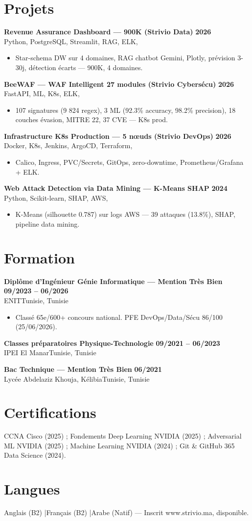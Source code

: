 \documentclass[a4paper,10pt]{article}
\newcommand{\cventry}[4]{\textbf{#1} \hfill \textbf{#4}\\[1pt]#2{\ifx\relax#3\relax\else, #3\fi}\par\vspace{2pt}}
\begin{document}
\section{Projets}
\cventry{Revenue Assurance Dashboard — 900K (Strivio Data)}{Python, PostgreSQL, Streamlit, RAG, ELK}{}{2026}
\begin{itemize}
  \item Star-schema DW sur 4 domaines, RAG chatbot Gemini, Plotly, prévision 3-30j, détection écarts — 900K, 4 domaines.
\end{itemize}
\cventry{BeeWAF — WAF Intelligent 27 modules (Strivio Cybersécu)}{FastAPI, ML, K8s, ELK}{}{2026}
\begin{itemize}
  \item 107 signatures (9 824 regex), 3 ML (92.3\% accuracy, 98.2\% precision), 18 couches évasion, MITRE 22, 37 CVE — K8s prod.
\end{itemize}
\cventry{Infrastructure K8s Production — 5 nœuds (Strivio DevOps)}{Docker, K8s, Jenkins, ArgoCD, Terraform}{}{2026}
\begin{itemize}
  \item Calico, Ingress, PVC/Secrets, GitOps, zero-downtime, Prometheus/Grafana + ELK.
\end{itemize}
\cventry{Web Attack Detection via Data Mining — K-Means SHAP}{Python, Scikit-learn, SHAP, AWS}{}{2024}
\begin{itemize}
  \item K-Means (silhouette 0.787) sur logs AWS — 39 attaques (13.8\%), SHAP, pipeline data mining.
\end{itemize}

\section{Formation}
\cventry{Diplôme d'Ingénieur Génie Informatique — Mention Très Bien}{ENIT}{Tunisie}{09/2023 -- 06/2026}
\begin{itemize}
  \item Classé 65e/600+ concours national. PFE DevOps/Data/Sécu 86/100 (25/06/2026).
\end{itemize}
\cventry{Classes préparatoires Physique-Technologie}{IPEI El Manar}{Tunisie}{09/2021 -- 06/2023}
\cventry{Bac Technique — Mention Très Bien}{Lycée Abdelaziz Khouja, Kélibia}{Tunisie}{06/2021}

\section{Certifications}
CCNA Cisco (2025) ; Fondements Deep Learning NVIDIA (2025) ; Adversarial ML NVIDIA (2025) ; Machine Learning NVIDIA (2024) ; Git \& GitHub 365 Data Science (2024).

\section{Langues}
Anglais (B2) \quad|\quad Français (B2) \quad|\quad Arabe (Natif) — Inscrit www.strivio.ma, disponible.
\end{document}
